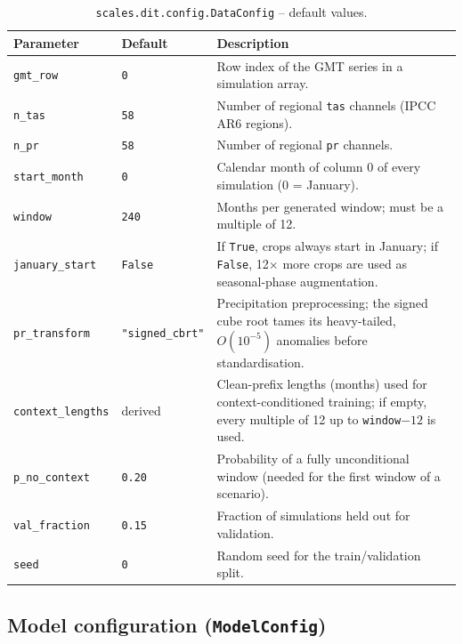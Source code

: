 \documentclass[11pt]{article}
\begin{document}
\begin{table}[h]
\centering
\caption{\texttt{scales.dit.config.DataConfig} -- default values.}
\begin{tabular}{@{}llL{7cm}@{}}
\toprule
Parameter & Default & Description \\
\midrule
\texttt{gmt\_row}        & \texttt{0}            & Row index of the GMT series in a simulation array. \\
\texttt{n\_tas}          & \texttt{58}           & Number of regional \texttt{tas} channels (IPCC AR6 regions). \\
\texttt{n\_pr}           & \texttt{58}           & Number of regional \texttt{pr} channels. \\
\texttt{start\_month}    & \texttt{0}            & Calendar month of column 0 of every simulation (0 = January). \\
\texttt{window}          & \texttt{240}          & Months per generated window; must be a multiple of 12. \\
\texttt{january\_start}  & \texttt{False}        & If \texttt{True}, crops always start in January; if \texttt{False}, 12$\times$ more crops are used as seasonal-phase augmentation. \\
\texttt{pr\_transform}   & \texttt{"signed\_cbrt"} & Precipitation preprocessing; the signed cube root tames its heavy-tailed, $O(10^{-5})$ anomalies before standardisation. \\
\texttt{context\_lengths}& derived               & Clean-prefix lengths (months) used for context-conditioned training; if empty, every multiple of 12 up to \texttt{window}$-12$ is used. \\
\texttt{p\_no\_context}  & \texttt{0.20}         & Probability of a fully unconditional window (needed for the first window of a scenario). \\
\texttt{val\_fraction}   & \texttt{0.15}         & Fraction of simulations held out for validation. \\
\texttt{seed}            & \texttt{0}            & Random seed for the train/validation split. \\
\bottomrule
\end{tabular}
\end{table}

\subsection{Model configuration (\texttt{ModelConfig})}
\end{document}
